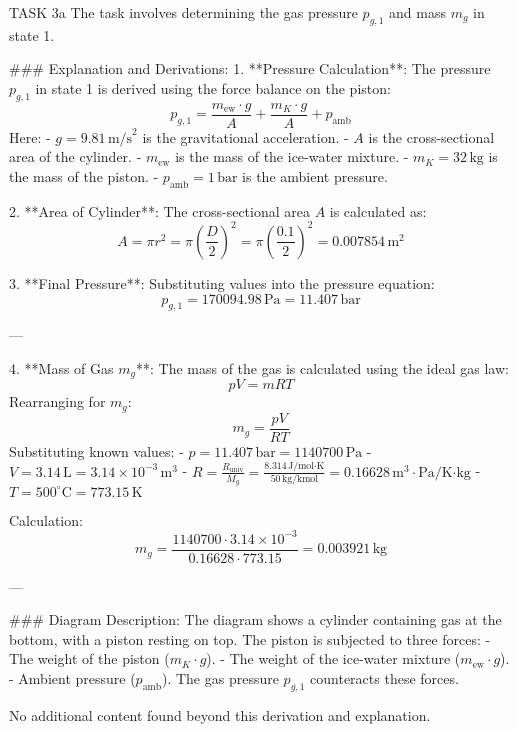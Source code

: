 TASK 3a  
The task involves determining the gas pressure \( p_{g,1} \) and mass \( m_g \) in state 1.  

### Explanation and Derivations:  
1. **Pressure Calculation**:  
   The pressure \( p_{g,1} \) in state 1 is derived using the force balance on the piston:  
   \[
   p_{g,1} = \frac{m_{\text{ew}} \cdot g}{A} + \frac{m_K \cdot g}{A} + p_{\text{amb}}
   \]  
   Here:  
   - \( g = 9.81 \, \text{m/s}^2 \) is the gravitational acceleration.  
   - \( A \) is the cross-sectional area of the cylinder.  
   - \( m_{\text{ew}} \) is the mass of the ice-water mixture.  
   - \( m_K = 32 \, \text{kg} \) is the mass of the piston.  
   - \( p_{\text{amb}} = 1 \, \text{bar} \) is the ambient pressure.  

2. **Area of Cylinder**:  
   The cross-sectional area \( A \) is calculated as:  
   \[
   A = \pi r^2 = \pi \left( \frac{D}{2} \right)^2 = \pi \left( \frac{0.1}{2} \right)^2 = 0.007854 \, \text{m}^2
   \]  

3. **Final Pressure**:  
   Substituting values into the pressure equation:  
   \[
   p_{g,1} = 170094.98 \, \text{Pa} = 11.407 \, \text{bar}
   \]  

---

4. **Mass of Gas \( m_g \)**:  
   The mass of the gas is calculated using the ideal gas law:  
   \[
   pV = mRT
   \]  
   Rearranging for \( m_g \):  
   \[
   m_g = \frac{pV}{RT}
   \]  
   Substituting known values:  
   - \( p = 11.407 \, \text{bar} = 1140700 \, \text{Pa} \)  
   - \( V = 3.14 \, \text{L} = 3.14 \times 10^{-3} \, \text{m}^3 \)  
   - \( R = \frac{R_{\text{univ}}}{M_g} = \frac{8.314 \, \text{J/mol·K}}{50 \, \text{kg/kmol}} = 0.16628 \, \text{m}^3 \cdot \text{Pa}/\text{K·kg} \)  
   - \( T = 500^\circ\text{C} = 773.15 \, \text{K} \)  

   Calculation:  
   \[
   m_g = \frac{1140700 \cdot 3.14 \times 10^{-3}}{0.16628 \cdot 773.15} = 0.003921 \, \text{kg}
   \]  

---

### Diagram Description:  
The diagram shows a cylinder containing gas at the bottom, with a piston resting on top. The piston is subjected to three forces:  
- The weight of the piston (\( m_K \cdot g \)).  
- The weight of the ice-water mixture (\( m_{\text{ew}} \cdot g \)).  
- Ambient pressure (\( p_{\text{amb}} \)).  
The gas pressure \( p_{g,1} \) counteracts these forces.  

No additional content found beyond this derivation and explanation.